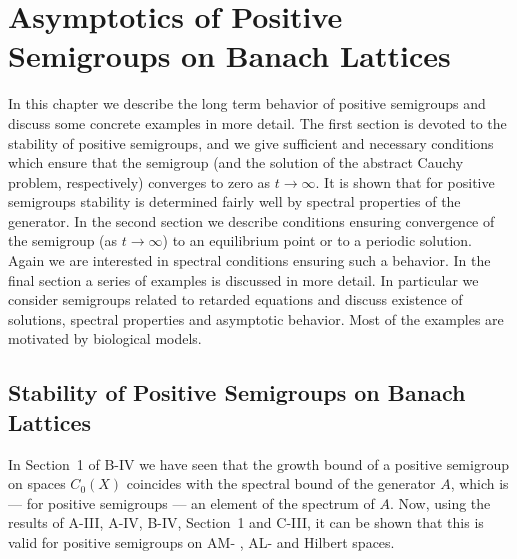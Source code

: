 \chapter{Asymptotics of Positive Semigroups on Banach Lattices}\label{chap:c4}%
In this chapter we describe the long term behavior of positive semigroups and discuss some concrete examples in more detail.
The first section is devoted to the stability of positive semigroups, and we give sufficient and necessary conditions which ensure that the semigroup (and the solution of the abstract Cauchy problem, respectively) converges to zero as $t \to \infty$.
It is shown that for positive semigroups stability is determined fairly well by spectral properties of the generator.
In the second section we describe conditions ensuring convergence of the semigroup (as $t \to \infty$) to an equilibrium point or to a periodic solution.
Again we are interested in spectral conditions ensuring such a behavior.
In the final section a series of examples is discussed in more detail.
In particular we consider semigroups related to retarded equations and discuss existence of solutions, spectral properties and asymptotic behavior.
Most of the examples are motivated by biological models.

\section{Stability of Positive Semigroups on Banach Lattices}\label{c4-1}%
\hspace{1cm}{\Large by Frank Neubrander}
\vspace{.5cm}
\newline
In Section~1 of B-IV we have seen that the growth bound of a positive semigroup on spaces $C_{0}(X)$ coincides with the spectral bound of the generator $A$, which is --- for positive semigroups --- an element of the spectrum of $A$.
Now, using the results of A-III, A-IV, B-IV, Section~1 and C-III, it can be shown that this is valid for positive semigroups on AM- , AL- and Hilbert spaces.

